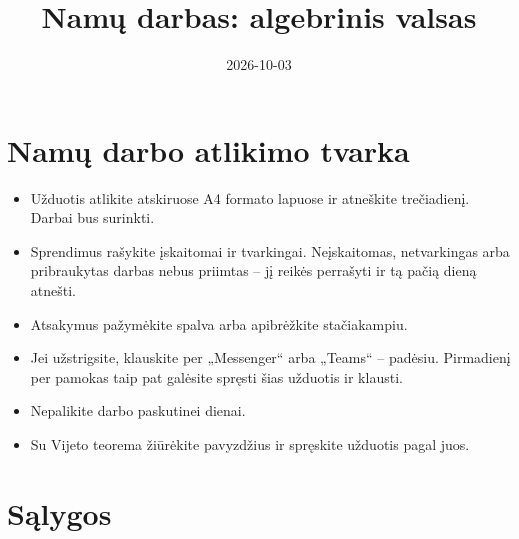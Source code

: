 \documentclass[12pt, a4paper]{article}
\title{\textbf{Namų darbas: algebrinis valsas}}
\author{}
\date{2026-10-03}
\begin{document}
\maketitle

\section*{Namų darbo atlikimo tvarka}

\begin{itemize}[leftmargin=*]
    \item Užduotis atlikite atskiruose A4 formato lapuose ir atneškite trečiadienį. Darbai bus surinkti.
    \item Sprendimus rašykite įskaitomai ir tvarkingai. Neįskaitomas, netvarkingas arba pribraukytas darbas nebus priimtas – jį reikės perrašyti ir tą pačią dieną atnešti.
    \item Atsakymus pažymėkite spalva arba apibrėžkite stačiakampiu.
    \item Jei užstrigsite, klauskite per „Messenger“ arba „Teams“ – padėsiu. Pirmadienį per pamokas taip pat galėsite spręsti šias užduotis ir klausti.
    \item Nepalikite darbo paskutinei dienai.
    \item Su Vijeto teorema žiūrėkite pavyzdžius ir spręskite užduotis pagal juos. 
\end{itemize}

\section{Sąlygos}
\end{document}
